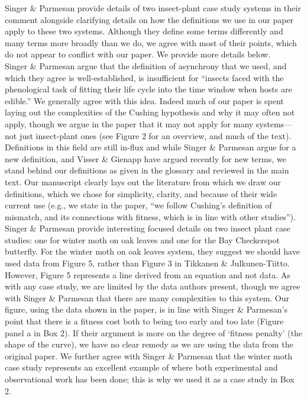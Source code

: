 \documentclass[11pt,letter]{article}
\begin{document}

\renewcommand{\refname}{\CHead{}}

Singer \& Parmesan provide details of two insect-plant case study systems in their comment alongside clarifying details on how the definitions we use in our paper apply to these two systems. Although they define some terms differently and many terms more broadly than we do, we agree with most of their points, which do not appear to conflict with our paper. We provide more details below.\\

Singer \& Parmesan argue that the definition of asynchrony that we used, and which they agree is well-established, is insufficient for ``insects faced with the phenological task of fitting their life cycle into the time window when hosts are edible.''  We generally agree with this idea. Indeed much of our paper is spent laying out the complexities of the Cushing hypothesis and why it may often not apply, though we argue in the paper that it may not apply for many systems---not just insect-plant ones (see Figure 2 for an overview, and much of the text). Definitions in this field are still in-flux and while Singer \& Parmesan argue for a new definition, and Visser \& Gienapp have argued recently for new terms, we stand behind our definitions as given in the glossary and reviewed in the main text. Our manuscript clearly lays out the literature from which we draw our definitions, which we chose for simplicity, clarity, and because of their wide current use (e.g., we state in the paper, ``we follow Cushing’s definition of mismatch, and its connections with fitness, which is in line with other studies''). \\%

Singer \& Parmesan provide interesting focused details on two insect plant case studies: one for winter moth on oak leaves and one for the Bay Checkerspot butterfly. For the winter moth on oak leaves system, they suggest we should have used data from Figure 5, rather than Figure 3 in Tikkanen \& Julkunen-Tiitto. However, Figure 5 represents a line derived from an equation and not data. As with any case study, we are limited by the data authors present, though we agree with Singer \& Parmesan that there are many complexities to this system. Our figure, using the data shown in the paper, is in line with Singer \& Parmesan's point that there is a fitness cost both to being too early and too late (Figure panel a in Box 2). If their argument is more on the degree of `fitness penalty' (the shape of the curve), we have no clear remedy as we are using the data from the original paper. We further agree with Singer \& Parmesan that the winter moth case study represents an excellent example of where both experimental and observational work has been done; this is why we used it as a case study in Box 2. \\
\end{document}
